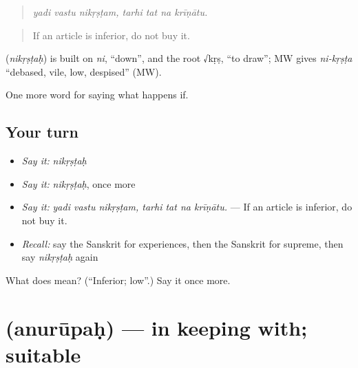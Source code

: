 \begin{quote}
\emph{yadi vastu nikṛṣṭam, tarhi tat na krīṇātu.}
\end{quote}

\begin{quote}
If an article is inferior, do not buy it.
\end{quote}

\begin{cousinweb}
\textbf{} (\emph{nikṛṣṭaḥ}) is built on \emph{ni}, \textquotedblleft{}down\textquotedblright{}, and the root √kṛṣ, \textquotedblleft{}to draw\textquotedblright{}; MW gives \emph{ni-kṛṣṭa} \textquotedblleft{}debased, vile, low, despised\textquotedblright{} (MW).
\end{cousinweb}

\begin{grammarlens}[title={What you've built}]
One more word for saying what happens if.
\end{grammarlens}

\subsection*{Your turn}
\begin{itemize}
\raggedright
  \item \emph{Say it:} \emph{nikṛṣṭaḥ}
  \item \emph{Say it:} \emph{nikṛṣṭaḥ}, once more
  \item \emph{Say it:} \emph{yadi vastu nikṛṣṭam, tarhi tat na krīṇātu.} — If an article is inferior, do not buy it.
  \item \emph{Recall:} say the Sanskrit for experiences, then the Sanskrit for supreme, then say \emph{nikṛṣṭaḥ} again
\end{itemize}

\begin{tcolorbox}[breakable,colback=teal!4,colframe=teal!35!black,title={Before you move on}]
What does  mean? (\textquotedblleft{}Inferior; low\textquotedblright{}.) Say it once more.
\end{tcolorbox}
\section[\texorpdfstring{\sk{अनुरूपः} (anurūpaḥ)}{अनुरूपः (anurūpaḥ)}]{ (anurūpaḥ) — in keeping with; suitable}

\label{lesson:SA-C391-anurupah}



